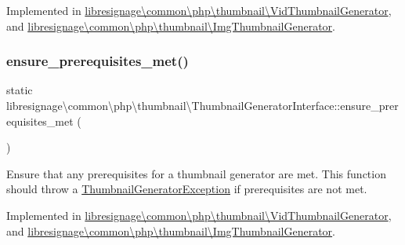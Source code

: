Implemented in \hyperlink{classlibresignage_1_1common_1_1php_1_1thumbnail_1_1VidThumbnailGenerator_a175338bc954004ef585a4cafd21bbb98}{libresignage\textbackslash{}common\textbackslash{}php\textbackslash{}thumbnail\textbackslash{}\+Vid\+Thumbnail\+Generator}, and \hyperlink{classlibresignage_1_1common_1_1php_1_1thumbnail_1_1ImgThumbnailGenerator_aa988f6ec383e43ddf2d1c017e1a0af4f}{libresignage\textbackslash{}common\textbackslash{}php\textbackslash{}thumbnail\textbackslash{}\+Img\+Thumbnail\+Generator}.

\mbox{\label{interfacelibresignage_1_1common_1_1php_1_1thumbnail_1_1ThumbnailGeneratorInterface_ada1412d696863bb01ad24dd47a3eba41}} 
\subsubsection{\texorpdfstring{ensure\+\_\+prerequisites\+\_\+met()}{ensure\_prerequisites\_met()}}
{\footnotesize\ttfamily static libresignage\textbackslash{}common\textbackslash{}php\textbackslash{}thumbnail\textbackslash{}\+Thumbnail\+Generator\+Interface\+::ensure\+\_\+prerequisites\+\_\+met (\begin{DoxyParamCaption}{ }\end{DoxyParamCaption})\hspace{0.3cm}{\ttfamily [static]}}

Ensure that any prerequisites for a thumbnail generator are met. This function should throw a \hyperlink{classlibresignage_1_1common_1_1php_1_1thumbnail_1_1ThumbnailGeneratorException}{Thumbnail\+Generator\+Exception} if prerequisites are not met. 

Implemented in \hyperlink{classlibresignage_1_1common_1_1php_1_1thumbnail_1_1VidThumbnailGenerator_a8c1e2627c46e1e14db021d803b610773}{libresignage\textbackslash{}common\textbackslash{}php\textbackslash{}thumbnail\textbackslash{}\+Vid\+Thumbnail\+Generator}, and \hyperlink{classlibresignage_1_1common_1_1php_1_1thumbnail_1_1ImgThumbnailGenerator_aaf9ec891b0098f04280029338054438d}{libresignage\textbackslash{}common\textbackslash{}php\textbackslash{}thumbnail\textbackslash{}\+Img\+Thumbnail\+Generator}.

